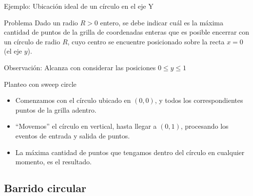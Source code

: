 \documentclass[compress]{beamer}
\begin{document}
\begin{frame}{Ejemplo: Ubicación ideal de un círculo en el eje Y}

\begin{block}{Problema}
    Dado un radio $R > 0$ entero, se debe indicar cuál es la máxima cantidad de puntos de la grilla de coordenadas enteras que es posible encerrar con un círculo de radio $R$, cuyo centro se encuentre posicionado sobre la recta $x=0$ (el eje $y$).
\end{block}

\pause
{}
{
    Observación: Alcanza con considerar las posiciones $0 \leq y \leq 1$
}

\end{frame}

\begin{frame}{Planteo con sweep circle}

\begin{itemize}
    \item Comenzamos con el círculo ubicado en $(0,0)$, y todos los correspondientes puntos de la grilla adentro.
    \item ``Movemos'' el círculo en vertical, hasta llegar a $(0,1)$, procesando los eventos de entrada y salida de puntos.
    \item La máxima cantidad de puntos que tengamos dentro del círculo en cualquier momento, es el resultado.
\end{itemize}

\pause


\end{frame}

\subsection{Barrido circular}
\end{document}
